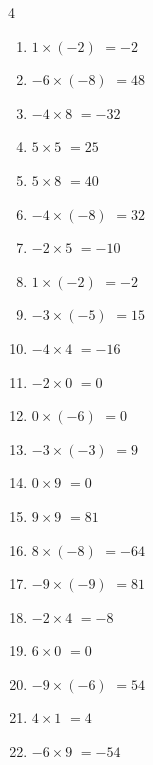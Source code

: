\begin{multicols}{4}
\begin{enumerate}
  \item $1\times (-2)$
        $=-2$

  \item $-6\times (-8)$
        $=48$

  \item $-4\times 8$
        $=-32$

  \item $5\times 5$
        $=25$

  \item $5\times 8$
        $=40$

  \item $-4\times (-8)$
        $=32$

  \item $-2\times 5$
        $=-10$

  \item $1\times (-2)$
        $=-2$

  \item $-3\times (-5)$
        $=15$

  \item $-4\times 4$
        $=-16$

  \item $-2\times 0$
        $=0$

  \item $0\times (-6)$
        $=0$

  \item $-3\times (-3)$
        $=9$

  \item $0\times 9$
        $=0$

  \item $9\times 9$
        $=81$

  \item $8\times (-8)$
        $=-64$

  \item $-9\times (-9)$
        $=81$

  \item $-2\times 4$
        $=-8$

  \item $6\times 0$
        $=0$

\columnbreak %

\resetques

  \item $-9\times (-6)$
        $=54$

  \item $4\times 1$
        $=4$

  \item $-6\times 9$
        $=-54$


\end{enumerate}
\end{multicols}
